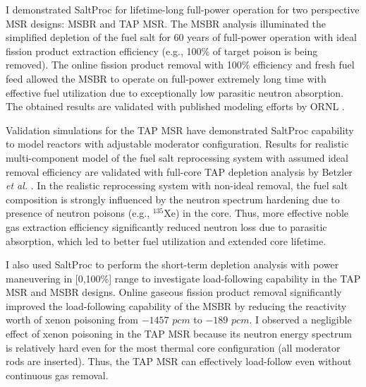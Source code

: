 I demonstrated SaltProc for lifetime-long full-power operation for two 
perspective \gls{MSR} designs: \gls{MSBR} and \gls{TAP} \gls{MSR}. The 
\gls{MSBR} analysis illuminated the simplified depletion of the fuel salt for 
60 years of full-power operation with ideal fission product extraction 
efficiency (e.g., 100\% of target poison is being removed). The online fission 
product removal with 100\% efficiency and fresh fuel feed allowed the 
\gls{MSBR} to operate on full-power extremely long time with effective fuel 
utilization due to exceptionally low parasitic neutron absorption. The 
obtained results are validated with published modeling efforts by \gls{ORNL} 
\cite{betzler_molten_2017}.

Validation simulations for the \gls{TAP} \gls{MSR} have demonstrated SaltProc 
capability to model reactors with adjustable moderator configuration. Results
for realistic multi-component model of the fuel salt reprocessing system with 
assumed ideal removal efficiency are validated with full-core \gls{TAP} 
depletion analysis by Betzler \emph{et al.} \cite{betzler_assessment_2017-1}. 
In the realistic reprocessing system with non-ideal removal, the fuel salt 
composition is strongly influenced by the neutron spectrum hardening due to 
presence of neutron poisons (e.g., $^{135}$Xe) in the core. Thus, more 
effective noble gas extraction efficiency significantly reduced neutron loss 
due to parasitic absorption, which led to
better fuel utilization and extended 
core lifetime.

I also used SaltProc to perform the short-term depletion analysis 
with power maneuvering in [0,100\%] range to investigate load-following 
capability in the \gls{TAP} \gls{MSR} and \gls{MSBR} designs. Online gaseous 
fission product removal significantly improved the load-following capability 
of the \gls{MSBR} by reducing the reactivity worth of xenon poisoning from 
$-1457$ $pcm$ to $-189$ $pcm$. I observed a negligible effect of xenon 
poisoning in the \gls{TAP} \gls{MSR} because its neutron energy spectrum is 
relatively hard even for the most thermal core configuration (all moderator 
rods are inserted). Thus, the \gls{TAP} \gls{MSR} can effectively load-follow 
even without continuous gas removal.

